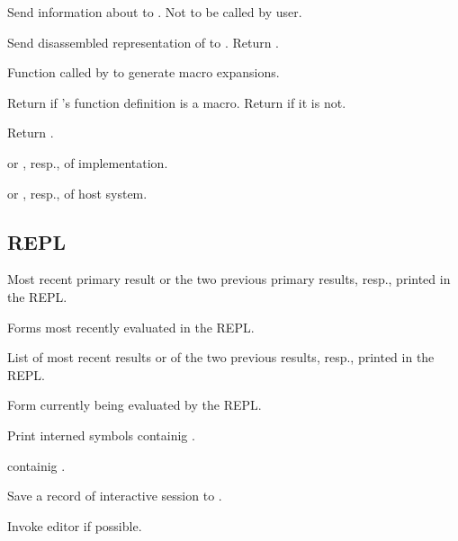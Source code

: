\begin{LIST}{1cm}
  Send information about  to . Not to be
  called by user.

  Send disassembled representation of  to
  . Return \retval{\NIL}.

  Function called by  to generate macro expansions.

  Return  if 's function definition
  is a macro. Return \retval{\NIL} if it is not.

  Return .

   or , resp., of implementation.

   or , resp., of host system.

\end{LIST}


\subsection{REPL} 

\begin{LIST}{1cm}
  
  \IT{\Goo{\kwd*{*}\XOR\kwd*{**}\XOR\V*{***}}}
  Most recent primary result or the two previous primary results,
  resp., printed in the REPL. 
  
  \IT{\Goo{\kwd*{+}\XOR\kwd*{++}\XOR\V*{+++}}}
  Forms most recently evaluated in the REPL.
  
  \IT{\Goo{\kwd*{/}\XOR\kwd*{//}\XOR\V*{///}}}
  List of most recent results or of the two previous results, resp., printed in the REPL.
  
  \IT{\kwd*{--}}
  Form currently being evaluated by the REPL.

  Print interned symbols containig .

   containig .

  Save a record of interactive session to .

  Invoke editor if possible.

\end{LIST}



